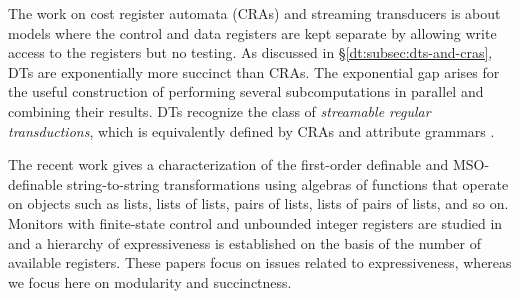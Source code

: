 The work on cost register automata (CRAs) \cite{AdADRY2013CRA, AR2013ARF} and streaming transducers \cite{AC2010SST, AC2011STA, AdA2012STT} is about models where the control and data registers are kept separate by allowing write access to the registers but no testing. As discussed in \S\ref{dt:subsec:dts-and-cras}, DTs are exponentially more succinct than CRAs. The exponential gap arises for the useful construction of performing several subcomputations in parallel and combining their results. DTs recognize the class of \emph{streamable regular transductions}, which
is equivalently defined by CRAs and attribute grammars \cite{arXiv2018}.

The recent work \cite{BDK2018} gives a characterization of the first-order definable and MSO-definable string-to-string transformations using algebras of functions that operate on objects such as lists, lists of lists, pairs of lists, lists of pairs of lists, and so on. Monitors with finite-state control and unbounded integer registers are studied in \cite{FHS2018} and a hierarchy of expressiveness is established on the basis of the number of available registers. These papers focus on issues related to expressiveness, whereas we focus here on modularity and succinctness.
